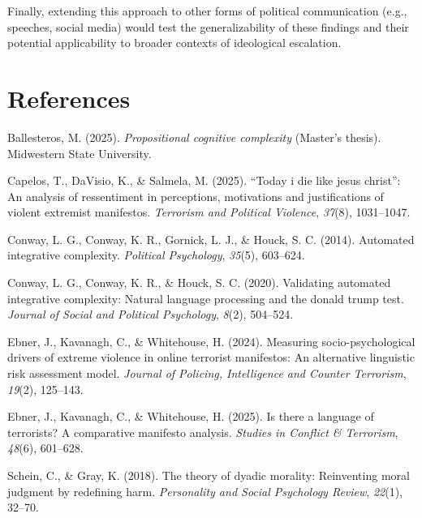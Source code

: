 \documentclass[
  english,
  man,floatsintext]{apa6}
\newlength{\cslhangindent}
\newenvironment{CSLReferences}[2] %
 {\begin{list}{}{%
  \setlength{\itemindent}{0pt}
  \setlength{\leftmargin}{0pt}
  \setlength{\parsep}{0pt}
  \ifodd #1
   \setlength{\leftmargin}{\cslhangindent}
   \setlength{\itemindent}{-1\cslhangindent}
  \fi
  \setlength{\itemsep}{#2\baselineskip}}}
 {\end{list}}
\begin{document}
Finally, extending this approach to other forms of political communication (e.g., speeches, social media) would test the generalizability of these findings and their potential applicability to broader contexts of ideological escalation.

\newpage

\section{References}\label{references}

\label{refs}
\begin{CSLReferences}{1}{0}
Ballesteros, M. (2025). \emph{Propositional cognitive complexity} (Master's thesis). Midwestern State University.

Capelos, T., DaVisio, K., \& Salmela, M. (2025). {``Today i die like jesus christ''}: An analysis of ressentiment in perceptions, motivations and justifications of violent extremist manifestos. \emph{Terrorism and Political Violence}, \emph{37}(8), 1031--1047.

Conway, L. G., Conway, K. R., Gornick, L. J., \& Houck, S. C. (2014). Automated integrative complexity. \emph{Political Psychology}, \emph{35}(5), 603--624.

Conway, L. G., Conway, K. R., \& Houck, S. C. (2020). Validating automated integrative complexity: Natural language processing and the donald trump test. \emph{Journal of Social and Political Psychology}, \emph{8}(2), 504--524.

Ebner, J., Kavanagh, C., \& Whitehouse, H. (2024). Measuring socio-psychological drivers of extreme violence in online terrorist manifestos: An alternative linguistic risk assessment model. \emph{Journal of Policing, Intelligence and Counter Terrorism}, \emph{19}(2), 125--143.

Ebner, J., Kavanagh, C., \& Whitehouse, H. (2025). Is there a language of terrorists? A comparative manifesto analysis. \emph{Studies in Conflict \& Terrorism}, \emph{48}(6), 601--628.

Schein, C., \& Gray, K. (2018). The theory of dyadic morality: Reinventing moral judgment by redefining harm. \emph{Personality and Social Psychology Review}, \emph{22}(1), 32--70.


\end{CSLReferences}
\end{document}
